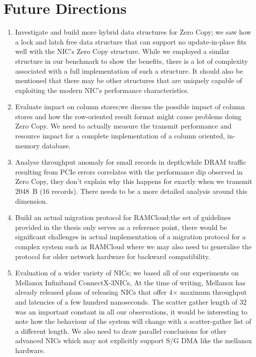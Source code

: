 \section{Future Directions}

\begin{enumerate}
\item Investigate and build more hybrid data structures for Zero Copy; we saw how a lock and latch free data structure that can support no update-in-place 
fits well with the NIC's Zero Copy structure. While we employed a similar structure in our benchmark to show the benefits, there is a lot of complexity associated 
with a full implementation of such a structure. It should also be mentioned that there may be other structures that are uniquely capable of exploiting the modern NIC's 
performance characteristics.
\item Evaluate impact on column stores;we discuss the possible impact of column stores and how the row-oriented result format might cause problems doing Zero Copy. We need 
to actually measure the transmit performance and resource impact for a complete implementation of a column oriented, in-memory database.
\item Analyse throughput anomaly for small records in depth;while DRAM traffic resulting from PCIe errors correlates with the performance dip observed in Zero Copy, 
they don't explain why this happens for exactly when we transmit 2048~B (16 records). There needs to be a more detailed analysis around this dimension.
\item Build an actual migration protocol for RAMCloud;the set of guidelines provided in the thesis only serves as a reference point, there would be significant challenges 
in actual implementation of a migration protocol for a complex system such as RAMCloud where we may also need to generalise the protocol for older network hardware for backward 
compatibility.
\item Evaluation of a wider variety of NICs; we based all of our experiments on Mellanox Infiniband ConnectX-3\textregistered NICs, At the time of writing, Mellanox has already 
released plans of releasing NICs that offer 4$\times$ maximum throughput and latencies of a few hundred nanoseconds. The scatter gather length of 32 was an important constant in 
all our observations, it would be interesting to note how the behaviour of the system will change with a scatter-gather list of a different length. We also need to draw parallel 
conclusions for other advanced NICs which may not explicitly support S/G DMA like the mellanox hardware.
\end{enumerate}

